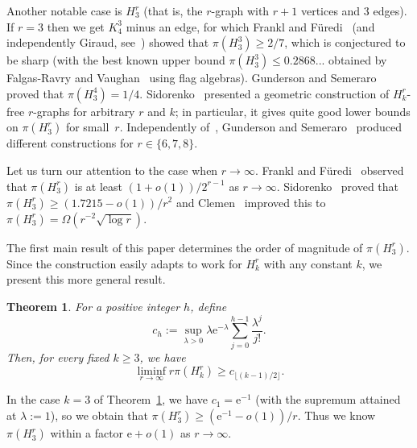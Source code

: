 \documentclass[12pt,a4paper]{article}
\numberwithin{equation}{section}
\newtheorem{theorem}{Theorem}[section]
\theoremstyle{definition}
\theoremstyle{remark}
\newcommand{\hide}[1]{{\color{DarkGreen}#1}}
\renewcommand{\hide}[1]{}
\newcommand{\me}{\mathrm{e}}
\begin{document}
Another notable case is $H_3^r$ (that is, the $r$-graph with $r+1$ vertices and 3 edges).  If $r=3$ then we get $K_4^3$ minus an edge, for which  Frankl and F\"uredi~\cite{FranklFuredi84} (and independently Giraud, see~\cite[Page 325]{FranklFuredi84}) showed that $\pi(H_3^3)\ge 2/7$, which is conjectured to be sharp (with the best known upper bound $\pi(H_3^3)\le 0.2868...$ obtained by Falgas-Ravry and Vaughan~\cite{FalgasVaughan13} using flag algebras). Gunderson and Semeraro~\cite{GundersonSemeraro17} proved that $\pi(H_3^4)=1/4$. Sidorenko~\cite{Sidorenko24} presented a geometric construction of $H_k^r$-free $r$-graphs for arbitrary $r$ and $k$; in particular, it gives quite good lower bounds on $\pi(H_3^r)$ for small~$r$. Independently of~\cite{Sidorenko24}, 
Gunderson and Semeraro~\cite[Theorem~1.1]{GundersonSemeraro25} produced different constructions for $r\in\{6,7,8\}$.
\hide{Gunderson and Semeraro~\cite{GundersonSemeraro25} proved $\pi(H_3^6)\ge 9/64$, $\pi(H_3^7)\ge 35/2^{11}$, and $\pi(H_3^8)\ge 315/2^{14}$.}

Let us turn our attention to the case when $r\to\infty$. Frankl and F\"uredi~\cite[Example~3]{FranklFuredi84} observed that $\pi(H_3^r)$ is at least $(1+o(1))/2^{r-1}$ as $r\to\infty$.
Sidorenko~\cite[Corollary 4.6]{Sidorenko24} proved that $\pi(H_3^r)\ge (1.7215-o(1))/r^{2}$ and Clemen~\cite[Theorem~1.2]{Clemen26} improved this to $\pi(H_3^r)= \Omega( r^{-2}\sqrt{\log r})$.

The first main result of this paper determines the order of magnitude of $\pi(H_3^r)$. Since the construction easily adapts to work for $H_k^r$ with any constant $k$, we present this more general result.

\begin{theorem}\label{thm:mainPoisson}
	For a positive integer $h$, define
	\begin{equation*}		c_h:=\sup_{\lambda>0}\lambda\me^{-\lambda}
		\sum_{j=0}^{h-1}\frac{\lambda^j}{j!}.
	\end{equation*}
	Then, for every fixed $k\ge3$, we have
	\begin{equation}\label{eq:poisson-fixed-bound}
		\liminf_{r\to\infty}r\pi(H_k^r)
		\ge c_{\lfloor(k-1)/2\rfloor}.
	\end{equation}
\end{theorem}


In the case $k=3$ of Theorem~\ref{thm:mainPoisson}, we have $c_1=\me^{-1}$ (with the supremum attained at $\lambda:=1$), so we obtain that $\pi(H_3^r)\ge (\me^{-1}-o(1))/r$. Thus we know $\pi(H_3^r)$ within a factor $\me+o(1)$ as $r\to\infty$.
\end{document}
